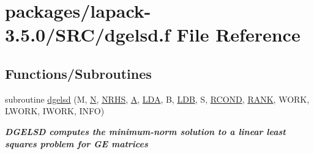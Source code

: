 \hypertarget{dgelsd_8f}{}\section{packages/lapack-\/3.5.0/\+S\+R\+C/dgelsd.f File Reference}
\label{dgelsd_8f}
\subsection*{Functions/\+Subroutines}
\begin{DoxyCompactItemize}
\item 
subroutine \hyperlink{group__doubleGEsolve_ga94bd4a63a6dacf523e25ff617719f752}{dgelsd} (M, \hyperlink{polmisc_8c_a0240ac851181b84ac374872dc5434ee4}{N}, \hyperlink{example__user_8c_aa0138da002ce2a90360df2f521eb3198}{N\+R\+H\+S}, \hyperlink{classA}{A}, \hyperlink{example__user_8c_ae946da542ce0db94dced19b2ecefd1aa}{L\+D\+A}, B, \hyperlink{example__user_8c_a50e90a7104df172b5a89a06c47fcca04}{L\+D\+B}, S, \hyperlink{superlu__enum__consts_8h_af00a42ecad444bbda75cde1b64bd7e72a9b5c151728d8512307565994c89919d5}{R\+C\+O\+N\+D}, \hyperlink{splinemodule_8c_a3a88bcc63386de30443dacede2e01847}{R\+A\+N\+K}, W\+O\+R\+K, L\+W\+O\+R\+K, I\+W\+O\+R\+K, I\+N\+F\+O)
\begin{DoxyCompactList}\small\item\em {\bfseries  D\+G\+E\+L\+S\+D computes the minimum-\/norm solution to a linear least squares problem for G\+E matrices} \end{DoxyCompactList}\end{DoxyCompactItemize}
